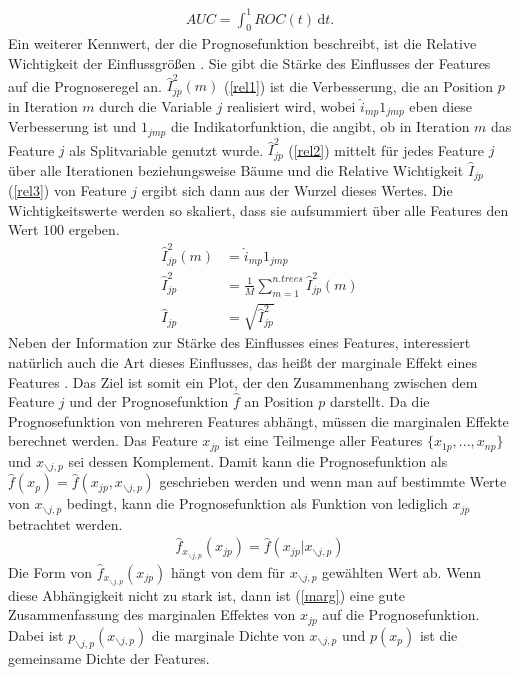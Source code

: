 \begin{align}
	AUC = \int_0^1 \! ROC(t) \, \mathrm{d}t. \label{formelAUC}
\end{align}
Ein weiterer Kennwert, der die Prognosefunktion beschreibt, ist die Relative Wichtigkeit der Einflussgrößen \cite{fried_greedy}. Sie gibt die Stärke des Einflusses der Features auf die Prognoseregel an. $\hat{I}_{jp}^2(m)$ (\ref{rel1}) ist die Verbesserung, die an Position $p$ in Iteration $m$ durch die Variable $j$ realisiert wird, wobei $\hat{i}_{mp} 1_{jmp}$ eben diese Verbesserung ist und $1_{jmp}$ die Indikatorfunktion, die angibt, ob in Iteration $m$ das Feature $j$ als Splitvariable genutzt wurde. $\hat{I}_{jp}^2$ (\ref{rel2}) mittelt für jedes Feature $j$ über alle Iterationen beziehungsweise Bäume und die Relative Wichtigkeit $\hat{I}_{jp}$ (\ref{rel3}) von Feature $j$ ergibt sich dann aus der Wurzel dieses Wertes. Die Wichtigkeitswerte werden so skaliert, dass sie aufsummiert über alle Features den Wert $100$ ergeben.
\begin{align}
	\hat{I}_{jp}^2(m) &= \hat{i}_{mp} 1_{jmp} \label{rel1} \\
	\hat{I}_{jp}^2 &= \frac{1}{M} \sum_{m=1}^{n.trees} \hat{I}_{jp}^2(m) \label{rel2} \\
	\hat{I}_{jp} &= \sqrt{\hat{I}_{jp}^2} \label{rel3}
\end{align}
Neben der Information zur Stärke des Einflusses eines Features, interessiert natürlich auch die Art dieses Einflusses, das heißt der marginale Effekt eines Features \cite{fried_greedy}. Das Ziel ist somit ein Plot, der den Zusammenhang zwischen dem Feature $j$ und der Prognosefunktion $\hat{f}$ an Position $p$ darstellt. Da die Prognosefunktion von mehreren Features abhängt, müssen die marginalen Effekte berechnet werden. Das Feature $x_{jp}$ ist eine Teilmenge aller Features $\{x_{1p},...,x_{np}\}$ und $x_{\backslash j,p}$ sei dessen Komplement. Damit kann die Prognosefunktion als $\hat{f}(x_p)=\hat{f}(x_{jp},x_{\backslash j,p})$ geschrieben werden und wenn man auf bestimmte Werte von $x_{\backslash j,p}$ bedingt, kann die Prognosefunktion als Funktion von lediglich $x_{jp}$ betrachtet werden.
\begin{align}
	\hat{f}_{x_{\backslash j,p}}(x_{jp}) = \hat{f}(x_{jp}|x_{\backslash j,p})
\end{align}
Die Form von $\hat{f}_{x_{\backslash j,p}}(x_{jp})$ hängt von dem für $x_{\backslash j,p}$ gewählten Wert ab. Wenn diese Abhängigkeit nicht zu stark ist, dann ist (\ref{marg}) eine gute Zusammenfassung des marginalen Effektes von $x_{jp}$ auf die Prognosefunktion. Dabei ist $p_{\backslash j,p}(x_{\backslash j,p})$ die marginale Dichte von $x_{\backslash j,p}$ und $p(x_p)$ ist die gemeinsame Dichte der Features.

